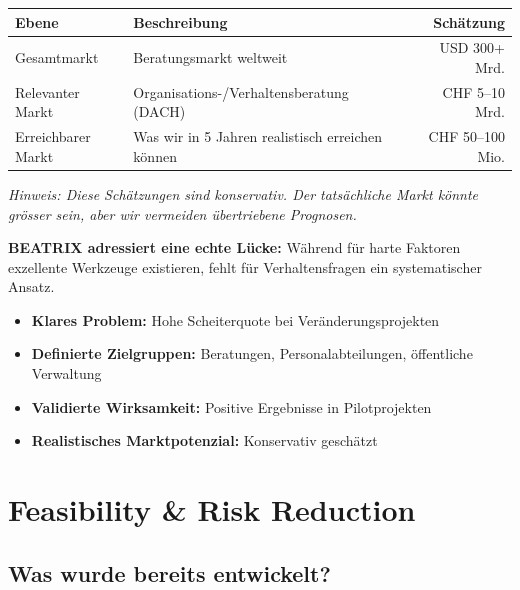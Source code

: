 \documentclass[11pt,a4paper]{article}
\begin{document}
\begin{table}[h]
\centering
\begin{tabularx}{\textwidth}{lXr}
\toprule
\textbf{Ebene} & \textbf{Beschreibung} & \textbf{Schätzung} \\
\midrule
Gesamtmarkt & Beratungsmarkt weltweit & USD 300+ Mrd. \\
Relevanter Markt & Organisations-/Verhaltensberatung (DACH) & CHF 5--10 Mrd. \\
Erreichbarer Markt & Was wir in 5 Jahren realistisch erreichen können & CHF 50--100 Mio. \\
\bottomrule
\end{tabularx}
\end{table}

\textit{Hinweis: Diese Schätzungen sind konservativ. Der tatsächliche Markt könnte grösser sein, aber wir vermeiden übertriebene Prognosen.}

\begin{summarybox}
\textbf{BEATRIX adressiert eine echte Lücke:} Während für harte Faktoren exzellente Werkzeuge existieren, fehlt für Verhaltensfragen ein systematischer Ansatz.

\begin{itemize}[noitemsep]
    \item \textbf{Klares Problem:} Hohe Scheiterquote bei Veränderungsprojekten
    \item \textbf{Definierte Zielgruppen:} Beratungen, Personalabteilungen, öffentliche Verwaltung
    \item \textbf{Validierte Wirksamkeit:} Positive Ergebnisse in Pilotprojekten
    \item \textbf{Realistisches Marktpotenzial:} Konservativ geschätzt
\end{itemize}
\end{summarybox}

\newpage

\section{Feasibility \& Risk Reduction}

\subsection{Was wurde bereits entwickelt?}
\end{document}
